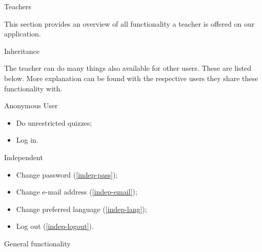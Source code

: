 
\begin{section}{Teachers}

    This section provides an overview of all functionality a teacher is offered
    on our application.

    \begin{subsection}{Inheritance}

        The teacher can do many things also available for other users. These are
        listed below. More explanation can be found with the respective users
        they share these functionality with.

        \begin{subsubsection}{Anonymous User}

            \begin{itemize}
                \item Do unrestricted quizzes;
                \item Log in.
            \end{itemize}

        \end{subsubsection}

        \begin{subsubsection}{Independent}

            \begin{itemize}
                \item Change password           (\ref{indep-pass});
                \item Change e-mail address     (\ref{indep-email});
                \item Change preferred language (\ref{indep-lang});
                \item Log out                   (\ref{indep-logout}).
            \end{itemize}

        \end{subsubsection}

    \end{subsection}

    \begin{subsection}{General functionality}
	

\end{subsection}
\end{section}
